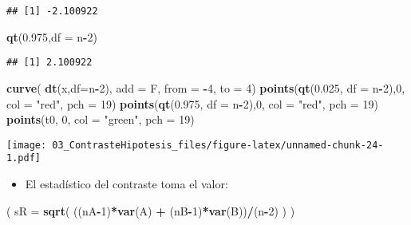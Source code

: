 \documentclass[]{article}
\newenvironment{Shaded}{\begin{snugshade}}{\end{snugshade}}
\newcommand{\KeywordTok}[1]{\textcolor[rgb]{0.13,0.29,0.53}{\textbf{#1}}}
\newcommand{\DataTypeTok}[1]{\textcolor[rgb]{0.13,0.29,0.53}{#1}}
\newcommand{\DecValTok}[1]{\textcolor[rgb]{0.00,0.00,0.81}{#1}}
\newcommand{\FloatTok}[1]{\textcolor[rgb]{0.00,0.00,0.81}{#1}}
\newcommand{\StringTok}[1]{\textcolor[rgb]{0.31,0.60,0.02}{#1}}
\newcommand{\OperatorTok}[1]{\textcolor[rgb]{0.81,0.36,0.00}{\textbf{#1}}}
\newcommand{\NormalTok}[1]{#1}
\providecommand{\tightlist}{%
  \setlength{\itemsep}{0pt}\setlength{\parskip}{0pt}}
\begin{document}
\begin{verbatim}
## [1] -2.100922
\end{verbatim}

\begin{Shaded}
\begin{Highlighting}[]
\KeywordTok{qt}\NormalTok{(}\FloatTok{0.975}\NormalTok{,}\DataTypeTok{df =}\NormalTok{ n}\OperatorTok{-}\DecValTok{2}\NormalTok{)}
\end{Highlighting}
\end{Shaded}

\begin{verbatim}
## [1] 2.100922
\end{verbatim}

\begin{Shaded}
\begin{Highlighting}[]
\KeywordTok{curve}\NormalTok{( }\KeywordTok{dt}\NormalTok{(x,}\DataTypeTok{df=}\NormalTok{n}\OperatorTok{-}\DecValTok{2}\NormalTok{), }\DataTypeTok{add =}\NormalTok{ F, }\DataTypeTok{from =} \OperatorTok{-}\DecValTok{4}\NormalTok{, }\DataTypeTok{to =} \DecValTok{4}\NormalTok{)}
\KeywordTok{points}\NormalTok{(}\KeywordTok{qt}\NormalTok{(}\FloatTok{0.025}\NormalTok{, }\DataTypeTok{df =}\NormalTok{ n}\OperatorTok{-}\DecValTok{2}\NormalTok{),}\DecValTok{0}\NormalTok{, }\DataTypeTok{col =} \StringTok{"red"}\NormalTok{, }\DataTypeTok{pch =} \DecValTok{19}\NormalTok{)}
\KeywordTok{points}\NormalTok{(}\KeywordTok{qt}\NormalTok{(}\FloatTok{0.975}\NormalTok{, }\DataTypeTok{df =}\NormalTok{ n}\OperatorTok{-}\DecValTok{2}\NormalTok{),}\DecValTok{0}\NormalTok{, }\DataTypeTok{col =} \StringTok{"red"}\NormalTok{, }\DataTypeTok{pch =} \DecValTok{19}\NormalTok{)}
\KeywordTok{points}\NormalTok{(t0, }\DecValTok{0}\NormalTok{, }\DataTypeTok{col =} \StringTok{"green"}\NormalTok{, }\DataTypeTok{pch =} \DecValTok{19}\NormalTok{)}
\end{Highlighting}
\end{Shaded}

\texttt{[image: 03\_ContrasteHipotesis\_files/figure-latex/unnamed-chunk-24-1.pdf]}

\begin{itemize}
\tightlist
\item
  El estadístico del contraste toma el valor:
\end{itemize}

\begin{Shaded}
\begin{Highlighting}[]
\NormalTok{( }\DataTypeTok{sR =} \KeywordTok{sqrt}\NormalTok{( ((nA}\OperatorTok{-}\DecValTok{1}\NormalTok{)}\OperatorTok{*}\KeywordTok{var}\NormalTok{(A) }\OperatorTok{+}\StringTok{ }\NormalTok{(nB}\OperatorTok{-}\DecValTok{1}\NormalTok{)}\OperatorTok{*}\KeywordTok{var}\NormalTok{(B))}\OperatorTok{/}\NormalTok{(n}\OperatorTok{-}\DecValTok{2}\NormalTok{) ) )}
\end{Highlighting}
\end{Shaded}
\end{document}
